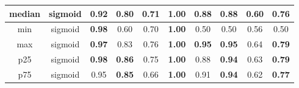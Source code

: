 \begin{table*}[!b]
\begin{tabular}{|c|c|c|c|c|c|c|c|c|c|}
        \hline
                 median &         sigmoid &                     0.92 &                          0.80 &                    0.71 &          \textbf{1.00} &                        0.88 &                        0.88 &                   0.60 &                        0.76 \\
        \hline
                    min &         sigmoid &            \textbf{0.98} &                          0.60 &                    0.70 &          \textbf{1.00} &                        0.50 &                        0.50 &                   0.56 &                        0.50 \\
        \hline
                    max &         sigmoid &            \textbf{0.97} &                          0.83 &                    0.76 &          \textbf{1.00} &               \textbf{0.95} &               \textbf{0.95} &                   0.64 &               \textbf{0.79} \\
        \hline
                    p25 &         sigmoid &            \textbf{0.98} &                 \textbf{0.86} &                    0.75 &          \textbf{1.00} &                        0.88 &               \textbf{0.94} &                   0.63 &               \textbf{0.79} \\
        \hline
                    p75 &         sigmoid &                     0.95 &                 \textbf{0.85} &                    0.66 &          \textbf{1.00} &                        0.91 &               \textbf{0.94} &                   0.62 &               \textbf{0.77} \\
        \hline
    \end{tabular}              
\end{table*}


